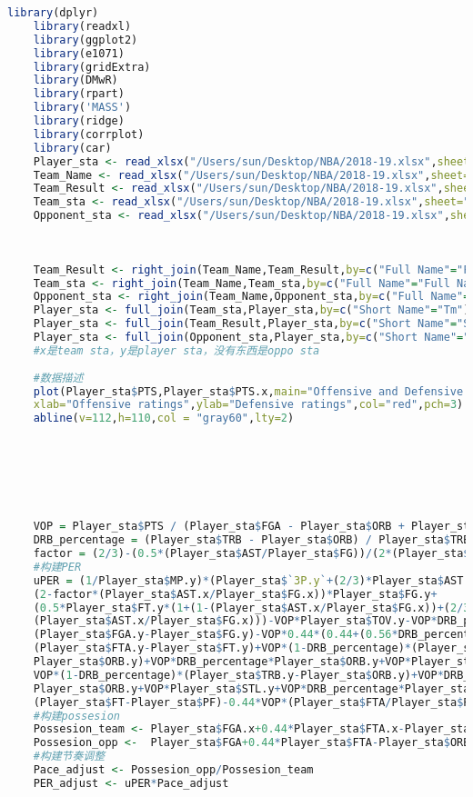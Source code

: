 \begin{lstlisting}[language=R,caption=My code]
	library(dplyr)
	library(readxl)
	library(ggplot2)
	library(e1071)
	library(gridExtra)
	library(DMwR)
	library(rpart)
	library('MASS')
	library(ridge)
	library(corrplot)
	library(car)
	Player_sta <- read_xlsx("/Users/sun/Desktop/NBA/2018-19.xlsx",sheet="Player_sta",col_names=T,na="NA")
	Team_Name <- read_xlsx("/Users/sun/Desktop/NBA/2018-19.xlsx",sheet="Team_Name",col_names=T,na="NA")
	Team_Result <- read_xlsx("/Users/sun/Desktop/NBA/2018-19.xlsx",sheet="Team_Result",col_names=T,na="NA")
	Team_sta <- read_xlsx("/Users/sun/Desktop/NBA/2018-19.xlsx",sheet="Team_sta",col_names=T,na="NA")
	Opponent_sta <- read_xlsx("/Users/sun/Desktop/NBA/2018-19.xlsx",sheet="Opponent_sta",col_names=T,na="NA")
	
	
	
	Team_Result <- right_join(Team_Name,Team_Result,by=c("Full Name"="Full Name"))
	Team_sta <- right_join(Team_Name,Team_sta,by=c("Full Name"="Full Name"))
	Opponent_sta <- right_join(Team_Name,Opponent_sta,by=c("Full Name"="Full Name"))
	Player_sta <- full_join(Team_sta,Player_sta,by=c("Short Name"="Tm"),keep=F)
	Player_sta <- full_join(Team_Result,Player_sta,by=c("Short Name"="Short Name"),keep=F)
	Player_sta <- full_join(Opponent_sta,Player_sta,by=c("Short Name"="Short Name"),keep=F)
	#x是team sta，y是player sta，没有东西是oppo sta
	
	#数据描述
	plot(Player_sta$PTS,Player_sta$PTS.x,main="Offensive and Defensive Ratings in 2018-19",
	xlab="Offensive ratings",ylab="Defensive ratings",col="red",pch=3)
	abline(v=112,h=110,col = "gray60",lty=2)
	
	
	
	
	
	
	
	VOP = Player_sta$PTS / (Player_sta$FGA - Player_sta$ORB + Player_sta$TOV + 0.44 * Player_sta$FTA)
	DRB_percentage = (Player_sta$TRB - Player_sta$ORB) / Player_sta$TRB
	factor = (2/3)-(0.5*(Player_sta$AST/Player_sta$FG))/(2*(Player_sta$FG/Player_sta$FT))
	#构建PER
	uPER = (1/Player_sta$MP.y)*(Player_sta$`3P.y`+(2/3)*Player_sta$AST.y+
	(2-factor*(Player_sta$AST.x/Player_sta$FG.x))*Player_sta$FG.y+
	(0.5*Player_sta$FT.y*(1+(1-(Player_sta$AST.x/Player_sta$FG.x))+(2/3)*
	(Player_sta$AST.x/Player_sta$FG.x)))-VOP*Player_sta$TOV.y-VOP*DRB_percentage*
	(Player_sta$FGA.y-Player_sta$FG.y)-VOP*0.44*(0.44+(0.56*DRB_percentage))*
	(Player_sta$FTA.y-Player_sta$FT.y)+VOP*(1-DRB_percentage)*(Player_sta$TRB.y-
	Player_sta$ORB.y)+VOP*DRB_percentage*Player_sta$ORB.y+VOP*Player_sta$STL.y+
	VOP*(1-DRB_percentage)*(Player_sta$TRB.y-Player_sta$ORB.y)+VOP*DRB_percentage*
	Player_sta$ORB.y+VOP*Player_sta$STL.y+VOP*DRB_percentage*Player_sta$BLK.y-
	(Player_sta$FT-Player_sta$PF)-0.44*VOP*(Player_sta$FTA/Player_sta$PF))
	#构建possesion
	Possesion_team <- Player_sta$FGA.x+0.44*Player_sta$FTA.x-Player_sta$ORB.x+Player_sta$TOV.x
	Possesion_opp <-  Player_sta$FGA+0.44*Player_sta$FTA-Player_sta$ORB+Player_sta$TOV
	#构建节奏调整
	Pace_adjust <- Possesion_opp/Possesion_team
	PER_adjust <- uPER*Pace_adjust
	

\end{lstlisting}
